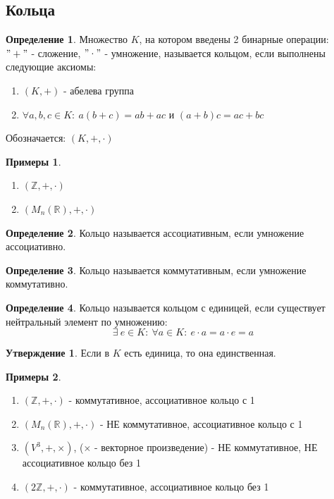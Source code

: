 \documentclass[a4paper, 12pt]{article}
\newcommand{\R}{\mathbb R}
\newcommand{\Z}{\mathbb Z}
\newcommand\tab[1][.5cm]{\hspace*{#1}}
\theoremstyle{definition}
\newtheorem*{definition}{Определение}
\newtheorem*{subtheorem}{Утверждение}
\newtheorem*{example}{Примеры}
\begin{document}
  \subsection{Кольца}
  \begin{definition}
    Множество $K$, на котором введены 2 бинарные операции:\\ $"+"$ - сложение, $"\cdot"$ - умножение, называется кольцом, если выполнены следующие аксиомы:
    \begin{enumerate}
      \item $(K, +)$ - абелева группа
      \item $\forall a,b,c \in K: \ a(b+c) = ab+ac$ и $(a+b)c = ac+bc$
    \end{enumerate}
    Обозначается: $(K, +, \cdot)$
  \end{definition} 
  \begin{example}\tab
    \begin{enumerate}
      \item $(\Z, +, \cdot)$
      \item $(M_n(\R), +, \cdot)$
    \end{enumerate}
  \end{example}
  \begin{definition}
    Кольцо называется ассоциативным, если умножение ассоциативно.
  \end{definition}
  \begin{definition}
    Кольцо называется коммутативным, если умножение коммутативно.
  \end{definition}
  \begin{definition}
    Кольцо называется кольцом с единицей, если существует нейтральный элемент по умножению:
    $$\exists \ e \in K: \ \forall a\in K: \ e \cdot a = a \cdot e = a$$ 
  \end{definition}
  \begin{subtheorem}
    Если в $K$ есть единица, то она единственная. 
  \end{subtheorem} 
  \begin{example} \tab
    \begin{enumerate}
      \item $(\Z, +, \cdot)$ - коммутативное, ассоциативное кольцо с 1
      \item $(M_n(\R), +, \cdot)$ - НЕ коммутативное, ассоциативное кольцо с 1
      \item $(V^3,+, \times)$, ($\times$ - векторное произведение) - НЕ коммутативное, НЕ ассоциативное кольцо без 1
      \item $(2\Z, +, \cdot)$ -  коммутативное, ассоциативное кольцо без 1
    \end{enumerate}
  \end{example}
\end{document}
